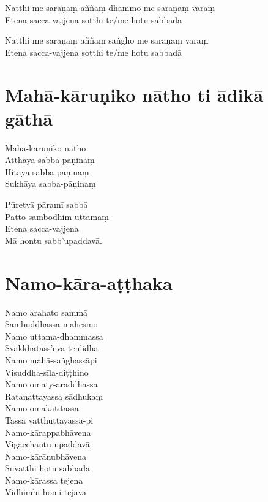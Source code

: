 Natthi me saraṇaṃ aññaṃ dhammo me saraṇaṃ varaṃ\\
Etena sacca-vajjena sotthi te/me hotu sabbadā

Natthi me saraṇaṃ aññaṃ saṅgho me saraṇaṃ varaṃ\\
Etena sacca-vajjena sotthi te/me hotu sabbadā

\section{Mahā-kāruṇiko nātho ti ādikā gāthā}


\begin{paritta}
Mahā-kāruṇiko nātho\\
Atthāya sabba-pāṇinaṃ\\
Hitāya sabba-pāṇinaṃ\\
Sukhāya sabba-pāṇinaṃ

Pūretvā pāramī sabbā\\
Patto sambodhim-uttamaṃ\\
Etena sacca-vajjena\\
Mā hontu sabb'upaddavā. 
\end{paritta}

\vspace*{-0.6\baselineskip}

\enlargethispage{3\baselineskip}

\section{Namo-kāra-aṭṭhaka}


\begin{paritta}
Namo arahato sammā\\
Sambuddhassa mahesino\\
Namo uttama-dhammassa\\
Svākkhātass'eva ten'idha\\
Namo mahā-saṅghassāpi\\
Visuddha-sīla-diṭṭhino\\
Namo omāty-āraddhassa\\
Ratanattayassa sādhukaṃ\\
Namo omakātītassa\\
Tassa vatthuttayassa-pi\\
Namo-kārappabhāvena\\
Vigacchantu upaddavā\\
Namo-kārānubhāvena\\
Suvatthi hotu sabbadā\\
Namo-kārassa tejena\\
Vidhimhi homi tejavā 
\end{paritta}

